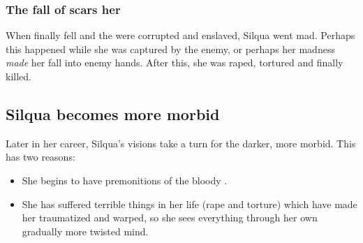 \subsubsection{The fall of \Kezerad{} scars her}
When \Kezerad{} finally fell and the \Sephiroth{} were corrupted and enslaved, Silqua went mad. 
Perhaps this happened while she was captured by the enemy, or perhaps her madness \emph{made} her fall into enemy hands. 
After this, she was raped, tortured and finally killed. 








\subsection{Silqua becomes more morbid}
Later in her career, Silqua's visions take a turn for the darker, more morbid. 
This has two reasons: 

\begin{itemize}
  \item She begins to have premonitions of the bloody .
  \item She has suffered terrible things in her life (rape and torture) which have made her traumatized and warped, so she sees everything through her own gradually more twisted mind. 
\end{itemize}



